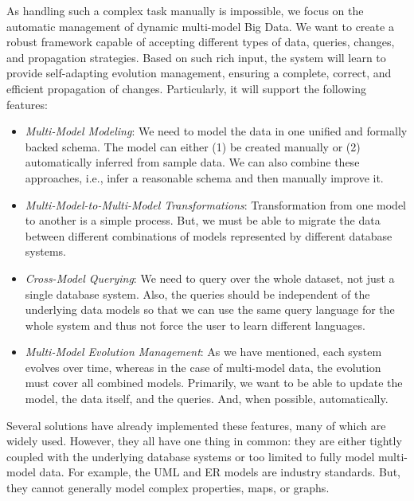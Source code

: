 As handling such a complex task manually is impossible, we focus on the automatic management of dynamic multi-model Big Data.  We want to create a robust framework capable of accepting different types of data, queries, changes, and propagation strategies. %
Based on such rich input, the system will learn to provide self-adapting evolution management, ensuring a complete, correct, and efficient propagation of changes.
Particularly, it will support the following features:
\begin{itemize}
    \item \textit{Multi-Model Modeling}: We need to model the data in one unified and formally backed schema. %
    The model can either (1) be created manually or (2)  automatically inferred from sample data. We can also combine these approaches, i.e., infer a reasonable schema and then manually improve it.
    \item \textit{Multi-Model-to-Multi-Model Transformations}: Transformation from one model to another is a simple process. But, we must be able to migrate the data between different combinations of models represented by different database systems. %
    \item \textit{Cross-Model Querying}: We need to query over the whole dataset, not just a single database system. Also, the queries should be independent of the underlying data models so that we can use the same query language for the whole system and thus not force the user to learn different languages.
    \item \textit{Multi-Model Evolution Management}: As we have mentioned, each system evolves over time, whereas in the case of multi-model data, the evolution must cover all combined models. Primarily, we want to be able to update the model, the data itself, and the queries. And, when possible, automatically.
\end{itemize}

Several solutions have already implemented these features, many of which are widely used. However, they all have one thing in common: they are either tightly coupled with the underlying database systems or too limited to fully model multi-model data. For example, the UML and ER models are industry standards. But, they cannot generally model complex properties, maps, or graphs.

